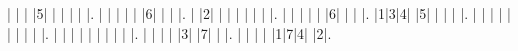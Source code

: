 \begin{sudoku-block}
| | | |5| | | | | |.
| | | | | |6| | | |.
| |2| | | | | | | |.
| | | | | |6| | | |.
|1|3|4| |5| | | | |.
| | | | | | | | | |.
| | | | | | | | | |.
| | | | |3| |7| | |.
| | | | |1|7|4| |2|.
\end{sudoku-block}
